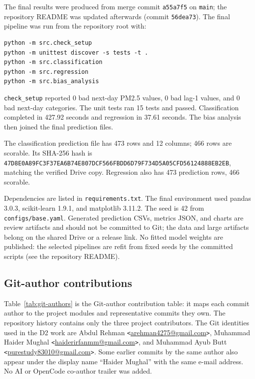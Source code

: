 The final results were produced from merge commit \texttt{a55a7f5} on \texttt{main}; the repository README was updated afterwards (commit \texttt{56dea73}). The final pipeline was run from the repository root with:

\begin{verbatim}
python -m src.check_setup
python -m unittest discover -s tests -t .
python -m src.classification
python -m src.regression
python -m src.bias_analysis
\end{verbatim}

\texttt{check\_setup} reported 0 bad next-day PM2.5 values, 0 bad lag-1 values, and 0 bad next-day categories. The unit tests ran 15 tests and passed. Classification completed in 427.92 seconds and regression in 37.61 seconds. The bias analysis then joined the final prediction files.

The classification prediction file has 473 rows and 12 columns; 466 rows are scorable. Its SHA-256 hash is \texttt{47D8E0A89FC3F37EA6B74E807DCF566FBDD6D79F734D5A05CFD56124888EB2EB}, matching the verified Drive copy. Regression also has 473 prediction rows, 466 scorable.

Dependencies are listed in \texttt{requirements.txt}. The final environment used pandas 3.0.3, scikit-learn 1.9.1, and matplotlib 3.11.2. The seed is 42 from \texttt{configs/base.yaml}. Generated prediction CSVs, metrics JSON, and charts are review artifacts and should not be committed to Git; the data and large artifacts belong on the shared Drive or a release link. No fitted model weights are published: the selected pipelines are refit from fixed seeds by the committed scripts (see the repository README).

\subsection{Git-author contributions}

Table~\ref{tab:git-authors} is the Git-author contribution table: it maps each commit author to the project modules and representative commits they own. The repository history contains only the three project contributors. The Git identities used in the D2 work are Abdul Rehman \texttt{<}\url{arehman4275@gmail.com}\texttt{>}, Muhammad Haider Mughal \texttt{<}\url{haiderirfanmm@gmail.com}\texttt{>}, and Muhammad Ayub Butt \texttt{<}\url{purestudy83010@gmail.com}\texttt{>}. Some earlier commits by the same author also appear under the display name ``Haider Mughal'' with the same e-mail address. No AI or OpenCode co-author trailer was added.

